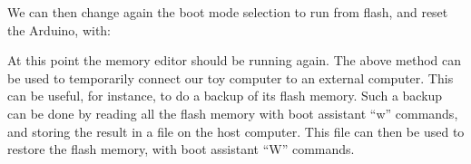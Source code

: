 
We can then change again the boot mode selection to run from flash, and reset
the Arduino, with:


At this point the memory editor should be running again. The above method can
be used to temporarily connect our toy computer to an external computer. This
can be useful, for instance, to do a backup of its flash memory. Such a backup
can be done by reading all the flash memory with boot assistant ``w'' commands,
and storing the result in a file on the host computer. This file can then be
used to restore the flash memory, with boot assistant ``W'' commands.
